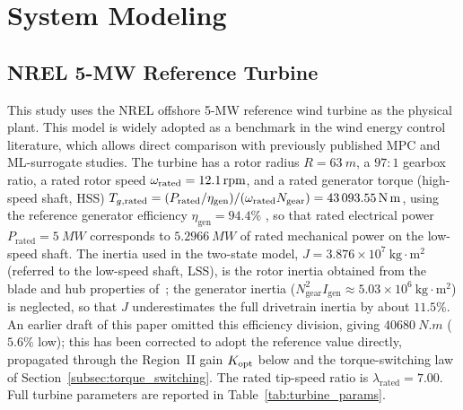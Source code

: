 
\section{System Modeling}
\label{sec:system_modeling}

\subsection{NREL 5-MW Reference Turbine}
\label{subsec:nrel5mw}

This study uses the NREL offshore 5-MW reference wind turbine
\cite{jonkman2009} as the physical plant. This model is widely adopted as a
benchmark in the wind energy control literature, which allows direct
comparison with previously published MPC and ML-surrogate studies. {\color{auditP2}The
turbine has a rotor radius $R = \SI{63}{m}$, a $97{:}1$ gearbox ratio, a rated rotor speed
$\omega_{\text{rated}} = \SI{12.1}{rpm}$, and a rated generator torque (high-speed
shaft, HSS) $T_{g,\text{rated}} = (P_{\text{rated}}/\eta_{\text{gen}}) /
(\omega_{\text{rated}} N_{\text{gear}}) = \SI{43093.55}{N.m}$, using the
reference generator efficiency $\eta_{\text{gen}}=94.4\%$
\cite{jonkman2009}, so that rated electrical power
$P_{\text{rated}}=\SI{5}{MW}$ corresponds to $\SI{5.2966}{MW}$ of
rated mechanical power on the low-speed shaft. The inertia used in the
two-state model, $J = 3.876 \times 10^{7}~\text{kg}\cdot\text{m}^2$
(referred to the low-speed shaft, LSS), is the rotor inertia obtained from
the blade and hub properties of~\cite{jonkman2009}; the generator inertia
($N_{\text{gear}}^{2} I_{\text{gen}} \approx 5.03\times10^{6}~\text{kg}\cdot\text{m}^2$)
is neglected, so that $J$ underestimates the full drivetrain inertia by
about $11.5\%$.} An earlier draft of
this paper omitted this efficiency division, giving
$\SI{40680}{N.m}$ ($5.6\%$ low); this has been corrected to adopt the
reference value directly, propagated through the Region~II gain
$K_{\text{opt}}$ below and the torque-switching law of
Section~\ref{subsec:torque_switching}. The rated tip-speed ratio is
$\lambda_{\text{rated}} = 7.00$. Full turbine parameters are reported in
Table~\ref{tab:turbine_params}.


